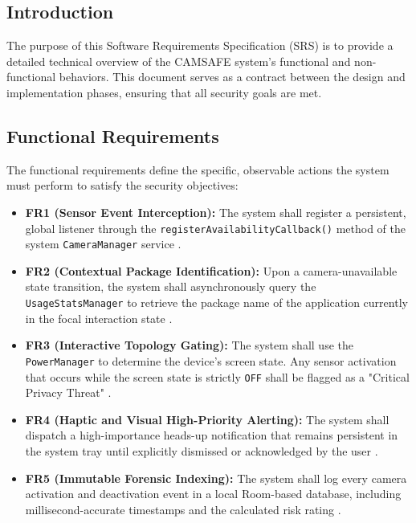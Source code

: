 \documentclass[12pt,a4paper]{report}
\begin{document}
\begin{enumerate}
    \subsection{Introduction}
    The purpose of this Software Requirements Specification (SRS) is to provide a detailed technical overview of the CAMSAFE system's functional and non-functional behaviors. This document serves as a contract between the design and implementation phases, ensuring that all security goals are met.

    \subsection{Functional Requirements}
    The functional requirements define the specific, observable actions the system must perform to satisfy the security objectives:
    \begin{itemize}
        \item \textbf{FR1 (Sensor Event Interception):} The system shall register a persistent, global listener through the \texttt{registerAvailabilityCallback()} method of the system \texttt{CameraManager} service \cite{androidhal}.
        \item \textbf{FR2 (Contextual Package Identification):} Upon a camera-unavailable state transition, the system shall asynchronously query the \texttt{UsageStatsManager} to retrieve the package name of the application currently in the focal interaction state \cite{contextaware}.
        \item \textbf{FR3 (Interactive Topology Gating):} The system shall use the \texttt{PowerManager} to determine the device's screen state. Any sensor activation that occurs while the screen state is strictly \texttt{OFF} shall be flagged as a "Critical Privacy Threat" \cite{checkmarx}.
        \item \textbf{FR4 (Haptic and Visual High-Priority Alerting):} The system shall dispatch a high-importance heads-up notification that remains persistent in the system tray until explicitly dismissed or acknowledged by the user \cite{privacydot}.
        \item \textbf{FR5 (Immutable Forensic Indexing):} The system shall log every camera activation and deactivation event in a local Room-based database, including millisecond-accurate timestamps and the calculated risk rating \cite{smarthome}.
    \end{itemize}


\end{enumerate}
\end{document}

